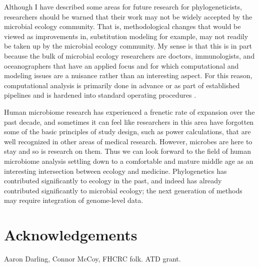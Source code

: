 \documentclass{amsart}
\newcommand{\forarxiv}[1]{#1}
\newcommand{\notforarxiv}[1]{}
\newcommand{\FIGmassTransport}{\
\begin{figure}[ht]
\begin{center}
  \forarxiv{\texttt{[image: mass\_transport.pdf]}}
\end{center}
\caption{\
  Caption goes here.
}
\label{FIGmassTransport}
\end{figure}
}
\begin{document}
Although I have described some areas for future research for phylogeneticists, researchers should be warned that their work may not be widely accepted by the microbial ecology community.
That is, methodological changes that would be viewed as improvements in, substitution modeling for example, may not readily be taken up by the microbial ecology community.
My sense is that this is in part because the bulk of microbial ecology researchers are doctors, immunologists, and oceanographers that have an applied focus and for which computational and modeling issues are a nuisance rather than an interesting aspect.
For this reason, computational analysis is primarily done in advance or as part of established pipelines and is hardened into standard operating procedures \citep{peplies2008standard}.

Human microbiome research has experienced a frenetic rate of expansion over the past decade, and sometimes it can feel like researchers in this area have forgotten some of the basic principles of study design, such as power calculations, that are well recognized in other areas of medical research.
However, microbes are here to stay and so is research on them.
Thus we can look forward to the field of human microbiome analysis settling down to a comfortable and mature middle age as an interesting intersection between ecology and medicine.
Phylogenetics has contributed significantly to ecology in the past, and indeed has already contributed significantly to microbial ecology; the next generation of methods may require integration of genome-level data.



\section{Acknowledgements}
Aaron Darling, Connor McCoy,
FHCRC folk.
ATD grant.


\notforarxiv{
\newpage
\section{Figure Legends}
\clearpage

\newpage
}



\end{document}
